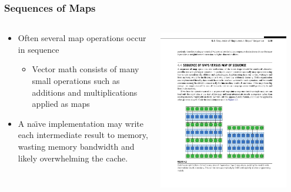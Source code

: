\documentclass[xcolor=dvipsnames]{beamer}
\begin{document}
		\begin{frame} \frametitle{Sequences of Maps}
      \begin{columns}
        \begin{column}{0.48\textwidth}
          \begin{itemize}
            \item
              Often several map operations occur in sequence
              \begin{itemize}
                \item
                  Vector math consists of many small operations such as
                  additions and multiplications applied as maps
              \end{itemize}
            \item
              A na\"\i ve implementation may write each intermediate result to
              memory, wasting memory bandwidth and likely overwhelming the
              cache.
          \end{itemize}
        \end{column}
        \begin{column}{0.48\textwidth}
          \centering
          \includegraphics[width=0.9\textwidth]{images/figure-4-2-1}
        \end{column}
      \end{columns}
		\end{frame}
\end{document}
